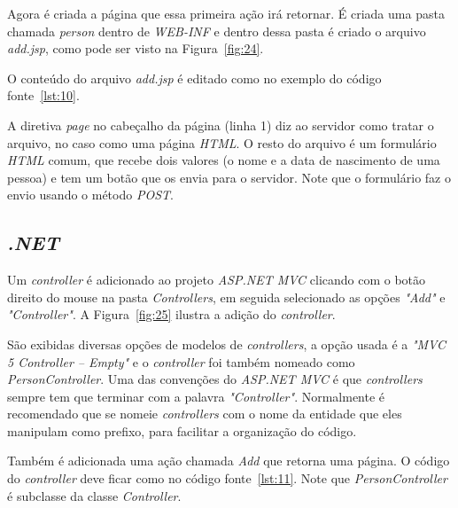 Agora é criada a página que essa primeira ação irá retornar. É criada uma pasta chamada \textit{person} dentro de \textit{WEB-INF} e dentro dessa pasta é criado o arquivo \textit{add.jsp}, como pode ser visto na Figura~\ref{fig:24}.


O conteúdo do arquivo \textit{add.jsp} é editado como no exemplo do código fonte~\ref{lst:10}.


A diretiva \textit{page} no cabeçalho da página (linha 1) diz ao servidor como tratar o arquivo, no caso como uma página \textit{HTML}. O resto do arquivo é um formulário \textit{HTML} comum, que recebe dois valores (o nome e a data de nascimento de uma pessoa) e tem um botão que os envia para o servidor. Note que o formulário faz o envio usando o método \textit{POST}.

\subsection{\textit{.NET}}

Um \textit{controller} é adicionado ao projeto \textit{ASP.NET MVC} clicando com o botão direito do mouse na pasta \textit{Controllers}, em seguida selecionado as opções \textit{"Add"} e \textit{"Controller"}. A Figura~\ref{fig:25} ilustra a adição do \textit{controller}.


São exibidas diversas opções de modelos de \textit{controllers}, a opção usada é a \textit{"MVC 5 Controller – Empty"} e o \textit{controller} foi também nomeado como \textit{PersonController}. Uma das convenções do \textit{ASP.NET MVC} é que \textit{controllers} sempre tem que terminar com a palavra \textit{"Controller"}. Normalmente é recomendado que se nomeie \textit{controllers} com o nome da entidade que eles manipulam como prefixo, para facilitar a organização do código.

Também é adicionada uma ação chamada \textit{Add} que retorna uma página. O código do \textit{controller} deve ficar como no código fonte~\ref{lst:11}. Note que \textit{PersonController} é subclasse da classe \textit{Controller}.



